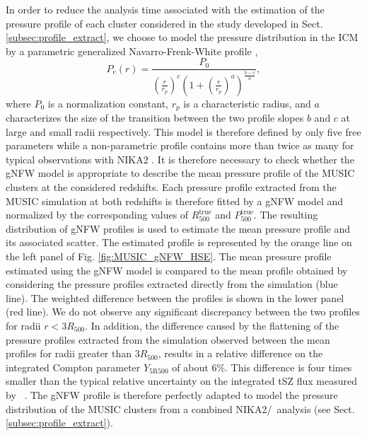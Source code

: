 \documentclass[twocolumn,traditabstract]{aa}
\begin{document}
In order to reduce the analysis time associated with the estimation of the pressure profile of each cluster considered in the study developed in Sect. \ref{subsec:profile_extract}, we choose to model the pressure distribution in the ICM by a parametric generalized Navarro-Frenk-White profile \citep[gNFW, ][]{nag07},
\begin{equation}
        P_e(r) = \frac{P_0}{\left(\frac{r}{r_p}\right)^c \left(1+\left(\frac{r}{r_p}\right)^a\right)^{\frac{b-c}{a}}},
\label{eq:gNFW}
\end{equation}
where $P_0$ is a normalization constant, $r_p$ is a characteristic radius, and $a$ characterizes the size of the transition between the two profile slopes $b$ and $c$ at large and small radii respectively. This model is therefore defined by only five free parameters while a non-parametric profile contains more than twice as many for typical observations with NIKA2 \citep{rup18}. It is therefore necessary to check whether the gNFW model is appropriate to describe the mean pressure profile of the MUSIC clusters at the considered redshifts. Each pressure profile extracted from the MUSIC simulation at both redshifts is therefore fitted by a gNFW model and normalized by the corresponding values of $R_{500}^{\mathrm{true}}$ and $P_{500}^{\mathrm{true}}$. The resulting distribution of gNFW profiles is used to estimate the mean pressure profile and its associated scatter. The estimated profile is represented by the orange line on the left panel of Fig. \ref{fig:MUSIC_gNFW_HSE}. The mean pressure profile estimated using the gNFW model is compared to the mean profile obtained by considering the pressure profiles extracted directly from the simulation (blue line). The weighted difference between the profiles is shown in the lower panel (red line). We do not observe any significant discrepancy between the two profiles for radii $r<3R_{500}$. In addition, the difference caused by the flattening of the pressure profiles extracted from the simulation observed between the mean profiles for radii greater than $3R_{500}$, results in a relative difference on the integrated Compton parameter $Y_{\mathrm{5R500}}$ of about 6\%. This difference is four times smaller than the typical relative uncertainty on the integrated tSZ flux measured by \planck\ \citep{pla16b}. The gNFW profile is therefore perfectly adapted to model the pressure distribution of the MUSIC clusters from a combined NIKA2/\planck\ analysis (see Sect. \ref{subsec:profile_extract}).\\
\end{document}
